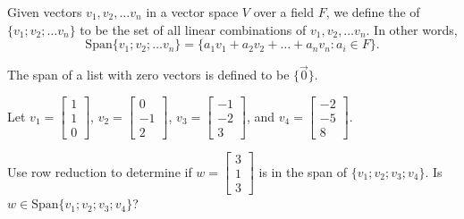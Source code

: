 \edXsolution{ 
}


\endedxproblem

\endedxvertical





\endedxvertical




Given vectors $v_1, v_2, \ldots v_n$ in a vector space $V$ over a field $F$, we define
the {} of $\{v_1; v_2; \ldots v_n\}$ to be the set of all linear combinations
of  $v_1, v_2, \ldots v_n$.  In other words, 
\[ \mathrm{Span}\{v_1; v_2; \ldots v_n\} = \{a_1 v_1  + a_2 v_2 + \ldots + a_nv_n  : a_i \in F \}.\]

The span of a list with zero vectors is defined to be $\{\vec0\}$.  


\endedxtext





Let $v_1 = \left[\begin{array}{c} 1 \\ 1  \\ 0 \end{array} \right]$, 
$v_2 = \left[\begin{array}{c} 0 \\ -1  \\ 2 \end{array} \right]$,
$v_3 = \left[\begin{array}{c} -1 \\ -2  \\ 3 \end{array} \right]$, and
$v_4 = \left[\begin{array}{c} -2 \\ -5  \\ 8 \end{array} \right]$.  

Use row reduction to determine if  $w = \left[\begin{array}{c} 3 \\ 1 \\ 3 \end{array} \right]$
is in the span of $\{v_1; v_2; v_3; v_4 \}$.  Is $w \in \mathrm{Span}\{v_1; v_2; v_3; v_4 \}$?   



